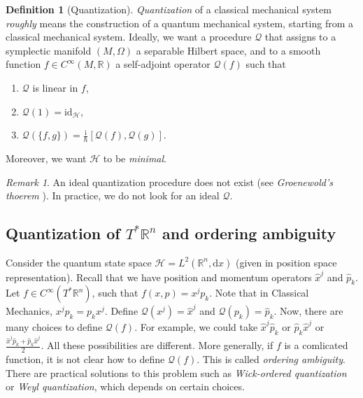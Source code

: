 \documentclass[12pt]{amsart}
\numberwithin{equation}{section}
\theoremstyle{plain}
\theoremstyle{definition}
\newtheorem{defn}{Definition}[subsection]
\theoremstyle{remark}
\newtheorem{rem}{Remark}[subsection]
\newcommand{\R}{\mathbb{R}}
\newcommand{\dd}{{\mathrm{d}}}
\newcommand{\id}{\mathrm{id}}
\newcommand{\calH}{\mathcal{H}}
\newcommand{\I}{\mathrm{i}}
\begin{document}
\begin{defn}[Quantization]
\emph{Quantization} of a classical mechanical system \emph{roughly} means the construction of a quantum mechanical system, starting from a classical mechanical system. Ideally, we want a procedure $\mathscr{Q}$ that assigns to a symplectic manifold $(M,\Omega)$ a separable Hilbert space, and to a smooth function $f\in C^\infty(M,\R)$ a self-adjoint operator $\mathscr{Q}(f)$ such that 
\begin{enumerate}[$(i)$]
\item{$\mathscr{Q}$ is linear in $f$,}
\item{$\mathscr{Q}(1)=\id_\calH$,}
\item{$\mathscr{Q}(\{f,g\})=\frac{\I}{\hbar}[\mathscr{Q}(f),\mathscr{Q}(g)]$.}
\end{enumerate}
Moreover, we want $\calH$ to be \emph{minimal}.
\end{defn}


\begin{rem}
An ideal quantization procedure does not exist (see \emph{Groenewold's thoerem} \cite{Groenewold1946}). In practice, we do not look for an ideal $\mathscr{Q}$.
\end{rem}

\subsection{Quantization of $T^*\R^n$ and ordering ambiguity}
Consider the quantum state space $\calH=L^2(\R^n,\dd x)$ (given in position space representation). Recall that we have position and momentum operators $\widehat{x}^j$ and $\widehat{p}_k$. Let $f\in C^\infty(T^*\R^n)$, such that $f(x,p)=x^jp_k$. Note that in Classical Mechanics, $x^jp_k=p_kx^j$. Define $\mathscr{Q}(x^j)=\widehat{x}^j$ and $\mathscr{Q}(p_k)=\widehat{p}_k$. Now, there are many choices to define $\mathscr{Q}(f)$. For example, we could take $\widehat{x}^j\widehat{p}_k$ or $\widehat{p}_k\widehat{x}^j$ or $\frac{\widehat{x}^j\widehat{p}_k+\widehat{p}_k\widehat{x}^j}{2}$. All these possibilities are different. More generally, if $f$ is a comlicated function, it is not clear how to define $\mathscr{Q}(f)$. This is called \emph{ordering ambiguity}. There are practical solutions to this problem such as \emph{Wick-ordered quantization} or \emph{Weyl quantization}, which depends on certain choices.
\end{document}
